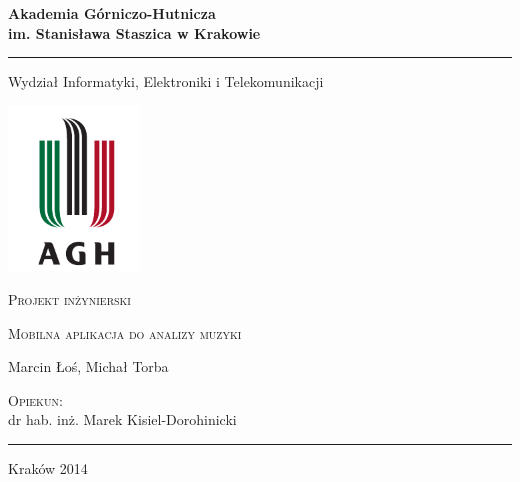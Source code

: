 
\newcommand{\ProjectTitle}{Mobilna aplikacja do analizy muzyki} 
\newcommand{\Department}{Wydział Informatyki, Elektroniki i Telekomunikacji}
\newcommand{\Agh}{Akademia Górniczo-Hutnicza\\ im. Stanisława Staszica w Krakowie}
\newcommand{\Authors}{Marcin Łoś, Michał Torba}
\newcommand{\Promotor}{dr hab. inż. Marek Kisiel-Dorohinicki}

\begin{titlepage}
\begin{center} 

{\Large\textbf{\Agh}}

\rule{0.7\textwidth}{1mm}
\vspace*{1.4mm}

{\large\Department}
\vspace*{1cm}

\includegraphics[width=3.5cm]{images/agh_logo}

\vspace*{1cm}
{\huge\textsc{Projekt inżynierski}}
\vspace*{2cm}

{\Huge\textsc{\ProjectTitle}}
\vspace*{1.4cm}

{\LARGE\Authors}

\vspace*{2cm}

{\huge \Title}

\vfill
{}
{\Large \textsc{Opiekun:}\\\Promotor}

\singlespacing
\vspace*{0.1cm}

\rule{0.7\textwidth}{0.7mm}\vspace*{1mm}

\vspace*{1mm}
{\Large Kraków 2014}

\end{center}
\newpage
\thispagestyle{empty}

\mbox{}
\vfill


\end{titlepage}
